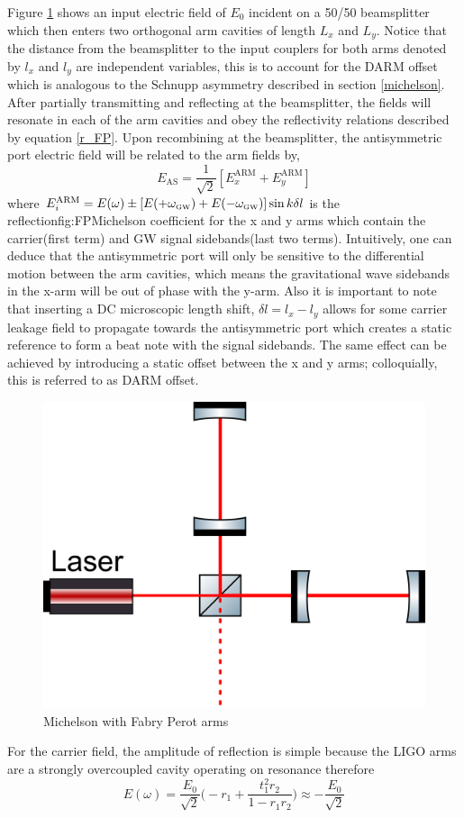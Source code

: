 		Figure \ref{fig:FPMichelson} shows an input electric field of $E_0$ incident on a 50/50 beamsplitter which then enters two orthogonal arm cavities of length $L_x$ and $L_y$.  Notice that the distance from the beamsplitter to the input couplers for both arms denoted by $l_x$ and $l_y$ are independent variables, this is to account for the DARM offset which is analogous to the Schnupp asymmetry described in section \ref{michelson}.  After partially transmitting and reflecting at the beamsplitter, the fields will resonate in each of the arm cavities and obey the reflectivity relations described by equation \ref{r_FP}.  Upon recombining at the beamsplitter, the antisymmetric port electric field will be related to the arm fields by,
		\begin{equation}
		E_{\text{AS}} = \frac{1}{\sqrt{2}} [E_{x}^{\text{ARM}} + E_{y}^{\text{ARM}} ] 
		\end{equation}
		where $E_{i}^{\text{ARM}} = E(\omega) \pm [E(+ \omega_{\text{\tiny GW}}) + E(- \omega_{\text{\tiny GW}})] \sin{k\delta l } $ is the reflectionfig:FPMichelson coefficient for the x and y arms which contain the carrier(first term) and GW signal sidebands(last two terms).  Intuitively, one can deduce that the antisymmetric port will only be sensitive to the differential motion between the arm cavities, which means the gravitational wave sidebands in the x-arm will be out of phase with the y-arm.  Also it is important to note that inserting a DC microscopic length shift, $\delta l = l_x - l_y$ allows for some carrier leakage field to propagate towards the antisymmetric port which creates a static reference to form a beat note with the signal sidebands.  The same effect can be achieved by introducing a static offset between the x and y arms; colloquially, this is referred to as DARM offset.
				
		\begin{figure}[ht]
			\centering
			\includegraphics[width=.3 \textwidth]{../Figures/FP_Mich.png}
			\caption{Michelson with Fabry Perot arms}
			\label{fig:FPMichelson}
		\end{figure}
	
		For the carrier field, the amplitude of reflection is simple because the LIGO arms are a strongly overcoupled cavity operating on resonance therefore 
		\begin{equation}
			E(\omega) = \frac{E_0}{\sqrt{2}}  \bigg(-r_1 + \frac{t_1^2 r_2}{1-r_1 r_2} \bigg) \approx -\frac{E_0}{\sqrt{2}}
		\end{equation}
		
